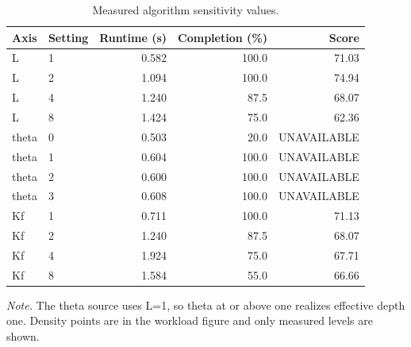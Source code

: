 \begin{table}[t]
\centering
\caption{Measured algorithm sensitivity values.}
\begin{tabular}{llrrr}
\toprule
Axis & Setting & Runtime (s) & Completion (\%) & Score \\
\midrule
L & 1 & 0.582 & 100.0 & 71.03 \\
L & 2 & 1.094 & 100.0 & 74.94 \\
L & 4 & 1.240 & 87.5 & 68.07 \\
L & 8 & 1.424 & 75.0 & 62.36 \\
theta & 0 & 0.503 & 20.0 & UNAVAILABLE \\
theta & 1 & 0.604 & 100.0 & UNAVAILABLE \\
theta & 2 & 0.600 & 100.0 & UNAVAILABLE \\
theta & 3 & 0.608 & 100.0 & UNAVAILABLE \\
Kf & 1 & 0.711 & 100.0 & 71.13 \\
Kf & 2 & 1.240 & 87.5 & 68.07 \\
Kf & 4 & 1.924 & 75.0 & 67.71 \\
Kf & 8 & 1.584 & 55.0 & 66.66 \\
\bottomrule
\end{tabular}
\end{table}
\textit{Note.} The theta source uses L=1, so theta at or above one realizes effective depth one. Density points are in the workload figure and only measured levels are shown.
